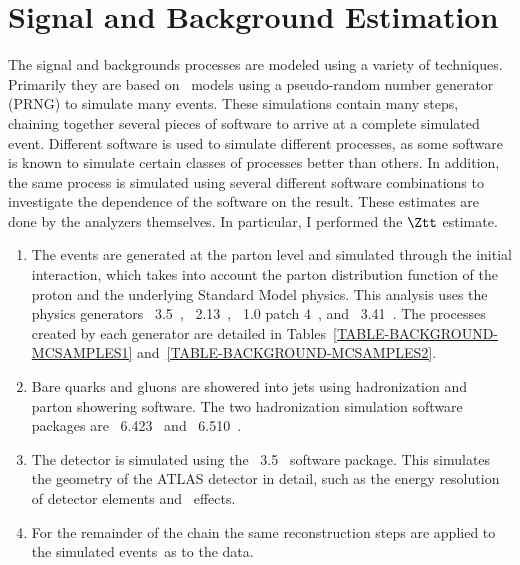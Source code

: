 \chapter{Signal and Background Estimation}
\label{SECTION-BACKGROUND-ESTIMATE}

The signal and backgrounds processes are modeled using a variety of techniques. Primarily they are based on \MC\ models using a pseudo-random number generator (PRNG) to simulate many events. These simulations contain many steps, chaining together several pieces of software to arrive at a complete simulated event. Different software is used to simulate different processes, as some software is known to simulate certain classes of processes better than others. In addition, the same process is simulated using several different software combinations to investigate the dependence of the software on the result. These estimates are done by the analyzers themselves. In particular, I performed the $\Ztt$ estimate.

\begin{enumerate}
\item The events are generated at the parton level and simulated through the initial interaction, which takes into account the parton distribution function of the proton and the underlying Standard Model physics. This analysis uses the physics generators \AcerMC\ 3.5~\cite{AcerMC}, \ALPGEN\ 2.13~\cite{ALPGEN}, \POWHEG\ 1.0 patch 4~\cite{POWHEG1,POWHEG2}, and \MCNLO\ 3.41~\cite{MCNLO1,MCNLO2}. The processes created by each generator are detailed in Tables~\ref{TABLE-BACKGROUND-MCSAMPLES1} and~\ref{TABLE-BACKGROUND-MCSAMPLES2}.

\item Bare quarks and gluons are showered into jets using hadronization and parton showering software. The two hadronization simulation software packages are \Pythia\ 6.423~\cite{PYTHIA} and \HERWIG\ 6.510~\cite{HERWIG}.

\item The detector is simulated using the \GEANT\ 3.5~\cite{GEANT4} software package. This simulates the geometry of the ATLAS detector in detail, such as the energy resolution of detector elements and \pileup\ effects.

\item For the remainder of the chain the same reconstruction steps are applied to the simulated events\ as to the data.

\end{enumerate}

